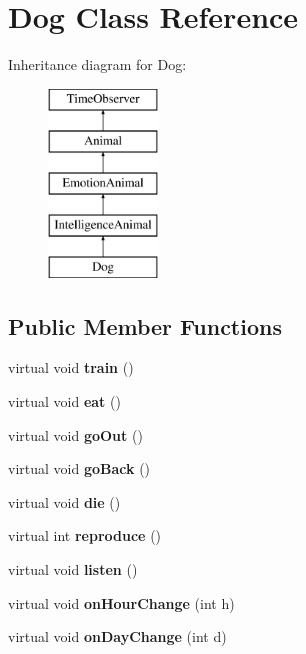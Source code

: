 \hypertarget{class_dog}{}\section{Dog Class Reference}
\label{class_dog}
Inheritance diagram for Dog\+:\begin{figure}[H]
\begin{center}
\leavevmode
\includegraphics[height=5.000000cm]{class_dog}
\end{center}
\end{figure}
\subsection*{Public Member Functions}
\begin{DoxyCompactItemize}
\item 
\mbox{\label{class_dog_aa3ac6ad4799963f3084b347cba19594e}} 
virtual void {\bfseries train} ()
\item 
\mbox{\label{class_dog_a03adeca9cd440ef988f9a07a41cc2f18}} 
virtual void {\bfseries eat} ()
\item 
\mbox{\label{class_dog_a32bc56294e6514c52d68b3e6ceb90768}} 
virtual void {\bfseries go\+Out} ()
\item 
\mbox{\label{class_dog_a41d697efa2242f02bd9a21605407f658}} 
virtual void {\bfseries go\+Back} ()
\item 
\mbox{\label{class_dog_a2d87cfdfd256fe56b0b83249dc11bdae}} 
virtual void {\bfseries die} ()
\item 
\mbox{\label{class_dog_a3b8fdd98742fea3b9e438538126edf6d}} 
virtual int {\bfseries reproduce} ()
\item 
\mbox{\label{class_dog_a6becf925701be98c59817d2a6697129c}} 
virtual void {\bfseries listen} ()
\item 
\mbox{\label{class_dog_a4820ede4339708ac557d05f70518e08b}} 
virtual void {\bfseries on\+Hour\+Change} (int h)
\item 
\mbox{\label{class_dog_a03fdea43325495ca60f1aad753b0fc6a}} 
virtual void {\bfseries on\+Day\+Change} (int d)
\end{DoxyCompactItemize}
